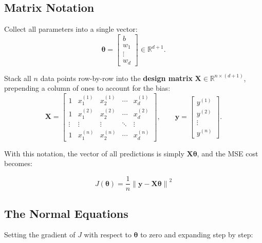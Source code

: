 \documentclass[12pt, a4paper]{article}
\newif\ifstudentmode
\newcommand{\sol}[2][6cm]{%
  \ifstudentmode
    \underline{\hspace{#1}}%
  \else
    {#2}%
  \fi
}
\theoremstyle{definition}
\newcommand{\bth}{\boldsymbol{\theta}}
\newcommand{\bX}{\mathbf{X}}
\newcommand{\by}{\mathbf{y}}
\begin{document}
\subsection{Matrix Notation}

Collect all parameters into a single vector:
\[
  \bth = \begin{bmatrix} b \\ w_1 \\ \vdots \\ w_d \end{bmatrix}
  \in \mathbb{R}^{d+1}.
\]

Stack all $n$ data points row-by-row into the \textbf{design matrix}
$\bX \in \mathbb{R}^{n \times (d+1)}$, prepending a column of ones to account
for the bias:
\[
  \bX =
  \begin{bmatrix}
    1 & x_1^{(1)} & x_2^{(1)} & \cdots & x_d^{(1)} \\
    1 & x_1^{(2)} & x_2^{(2)} & \cdots & x_d^{(2)} \\
    \vdots & \vdots & \vdots & \ddots & \vdots \\
    1 & x_1^{(n)} & x_2^{(n)} & \cdots & x_d^{(n)}
  \end{bmatrix},
  \qquad
  \by =
  \begin{bmatrix} y^{(1)} \\ y^{(2)} \\ \vdots \\ y^{(n)} \end{bmatrix}.
\]

With this notation, the vector of all predictions is simply $\bX\bth$, and the
MSE cost becomes:

\[
  J(\bth) = \sol[8cm]{\frac{1}{n}\left\|\by - \bX\bth\right\|^2}
\]

\subsection{The Normal Equations}

Setting the gradient of $J$ with respect to $\bth$ to zero and expanding
step by step:
\end{document}
